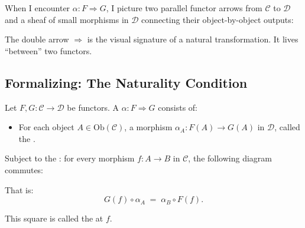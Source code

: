 \begin{dialog}
When I encounter $\alpha : F \Rightarrow G$, I picture two parallel functor
arrows from $\mathcal{C}$ to $\mathcal{D}$ and a sheaf of small morphisms
in $\mathcal{D}$ connecting their object-by-object outputs:
\medskip
\begin{center}
\end{center}
\medskip
The double arrow $\Rightarrow$ is the visual signature of a natural
transformation. It lives ``between'' two functors.
\end{dialog}

\subsection{Formalizing: The Naturality Condition}

Let $F, G : \mathcal{C} \to \mathcal{D}$ be functors. A  $\alpha : F \Rightarrow G$ consists of:

\begin{itemize}
  \item For each object $A \in \mathrm{Ob}(\mathcal{C})$, a morphism
        \(\alpha_A : F(A) \to G(A)\) in $\mathcal{D}$, called the
        .
\end{itemize}

Subject to the : for every morphism
$f : A \to B$ in $\mathcal{C}$, the following diagram commutes:
\medskip
\begin{center}
\end{center}
\medskip
That is:
\begin{equation*}
  G(f) \circ \alpha_A \;=\; \alpha_B \circ F(f).
\end{equation*}

This square is called the  at $f$.

